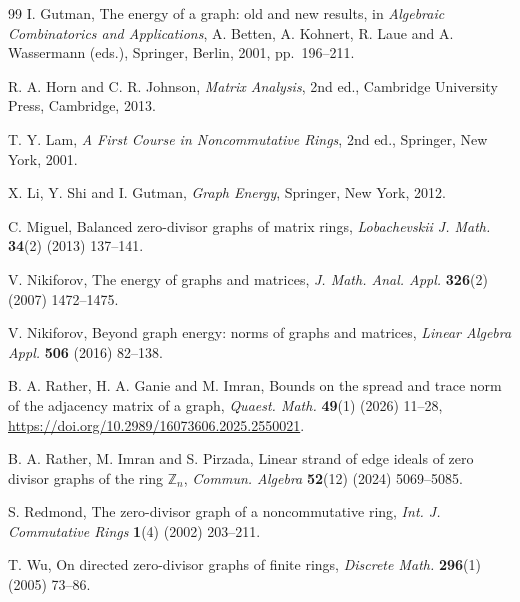 \documentclass[12pt]{article}
\theoremstyle{definition}
\begin{document}
\begin{thebibliography}{99}
		I. Gutman,
		The energy of a graph: old and new results,
		in \emph{Algebraic Combinatorics and Applications},
		A. Betten, A. Kohnert, R. Laue and A. Wassermann (eds.),
		Springer, Berlin, 2001, pp.~196--211.
		
		
		R. A. Horn and C. R. Johnson,
		\emph{Matrix Analysis},
		2nd ed., Cambridge University Press, Cambridge, 2013.
		
		T. Y. Lam,
		\emph{A First Course in Noncommutative Rings},
		2nd ed., Springer, New York, 2001.
		
		X. Li, Y. Shi and I. Gutman,
		\emph{Graph Energy},
		Springer, New York, 2012.
		
		C. Miguel,
		Balanced zero-divisor graphs of matrix rings,
		\emph{Lobachevskii J. Math.} \textbf{34}(2) (2013) 137--141.
		
		V. Nikiforov,
		The energy of graphs and matrices,
		\emph{J. Math. Anal. Appl.} \textbf{326}(2) (2007) 1472--1475.
		
		V. Nikiforov,
		Beyond graph energy: norms of graphs and matrices,
		\emph{Linear Algebra Appl.} \textbf{506} (2016) 82--138.
		
		 B. A. Rather, H. A. Ganie and M. Imran, Bounds on the spread and trace norm of the adjacency matrix of a graph, \emph{Quaest. Math.} \textbf{49}(1) (2026) 11--28, \url{https://doi.org/10.2989/16073606.2025.2550021}.
		
		 B. A. Rather,  M. Imran and S. Pirzada, Linear strand of edge ideals of zero divisor graphs of the ring $\mathbb{Z}_{n}$,  \emph{Commun. Algebra} \textbf{52}(12) (2024) 5069--5085.
		
		
		S. Redmond,
		The zero-divisor graph of a noncommutative ring,
		\emph{Int. J. Commutative Rings} \textbf{1}(4) (2002) 203--211.
		
		T. Wu,
		On directed zero-divisor graphs of finite rings,
		\emph{Discrete Math.} \textbf{296}(1) (2005) 73--86.
		
		
		
		
		
		
		
		
		
		
		
		
	\end{thebibliography}
	
	
\end{document}
